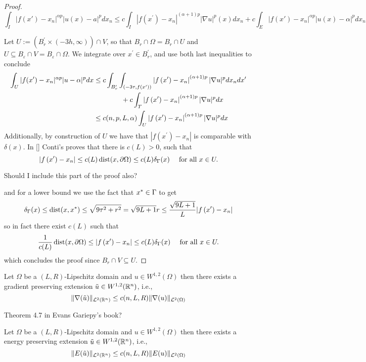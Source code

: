 \begin{proof}
$$
\int_I|f(x')-x_n|^{\alpha p}|u(x)-a|^p d x_n \leq c \int_I\left|f\left(x^{\prime}\right)-x_n\right|^{(\alpha+1)p}|\nabla u|^p(x) d x_n+c \int_E|f(x')-x_n|^{\alpha p}|u(x)-\alpha|^p d x_n
$$

Let $U:=\left(B_r^{\prime} \times(-3 h, \infty)\right) \cap V$, so that $B_r \cap \Omega=B_r \cap U$ and $U \subseteq B_{\varepsilon} \cap V=B_{\varepsilon} \cap \Omega$. We integrate over $x^{\prime} \in B_r^{\prime}$, and use both last inequalities to conclude
$$
\begin{aligned}
\int_U|f(x')-x_n|^{\alpha p}|u-\alpha|^p d x & \leq c \int_{B_r^{\prime}} \int_{\left(-3 \tau, f\left(x^{\prime}\right)\right)}\left|f\left(x^{\prime}\right)-x_n\right|^{(\alpha+1)p}|\nabla u|^p d x_n d x^{\prime}\\
&\qquad \qquad + c \int_T\left|f\left(x^{\prime}\right)-x_n\right|^{(\alpha+1)p}|\nabla u|^p d x \\
& \leq c(n,p,L,\alpha) \int_U\left|f\left(x^{\prime}\right)-x_n\right|^{(\alpha+1)p}|\nabla u|^p d x
\end{aligned}
$$
Additionally, by construction of $U$ we have that $|f\left(x^{\prime}\right)-x_n|$ is comparable with $\delta(x)$. In [] Conti's proves that there is $c(L)>0$, such that
$$
\left|f\left(x^{\prime}\right)-x_n\right| \leq c(L) \operatorname{dist}(x,\partial\Omega)\leq c(L)\delta_\Gamma(x) \quad \text { for all } x \in U .
$$

\begin{question}
    Should I include this part of the proof also?
\end{question}

and for a lower bound we use the fact that $x^*\in \Gamma$ to get
\begin{align*}
    \delta_\Gamma(x)\leq \operatorname{dist}(x,x^*)
    \leq\sqrt{9\tau^2+r^2}
    =\sqrt{9L+1}r
    \leq \frac{\sqrt{9L+1}}{L} |f\left(x^{\prime}\right)-x_n|
\end{align*}
so in fact there exist $c(L)$ such that
$$\frac{1}{c(L)} \operatorname{dist}(x,\partial\Omega)\leq \left|f\left(x^{\prime}\right)-x_n\right| \leq c(L) \delta_\Gamma(x) \quad \text { for all } x \in U .$$
which concludes the proof since $B_r \cap V \subseteq U$.
\end{proof}
\begin{lemma}\label{GradExt} Let $\Omega$ be a $(L, R)$-Lipschitz domain and $u\in W^{1,2}(\Omega)$ then there exists a gradient preserving extension $\tilde{u}\in W^{1,2}(\mathbb{R}^n)$, i.e.,
$$\|\nabla(\tilde{u})\|_{{\mathcal L}^2(\mathbb{R}^n)}\leq c(n,L,R)\|\nabla(u)\|_{{\mathcal L}^2(\Omega)}$$ 
\end{lemma}
\begin{question}
    Theorem 4.7 in Evans Gariepy's book?
\end{question}
\begin{lemma} \label{EnergyExt}Let $\Omega$ be a $(L, R)$-Lipschitz domain and $u\in W^{1,2}(\Omega)$ then there exists a energy preserving extension $\tilde{u}\in W^{1,2}(\mathbb{R}^n)$, i.e.,
$$\|E(\tilde{u})\|_{{\mathcal L}^2(\mathbb{R}^n)}\leq c(n,L,R)\|E(u)\|_{{\mathcal L}^2(\Omega)}$$ 
\end{lemma}


